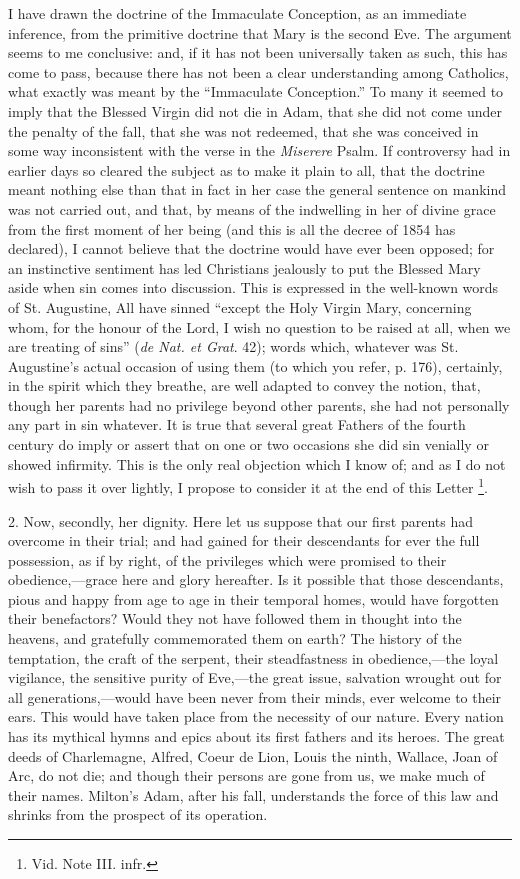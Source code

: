 I have drawn the doctrine of the Immaculate Conception, as an
immediate inference, from the primitive doctrine that Mary is the second
Eve. The argument seems to me conclusive: and, if it has not been
universally taken as such, this has come to pass, because there has not
been a clear understanding among Catholics, what exactly was meant by
the ``Immaculate Conception.'' To many it seemed to imply that
the Blessed Virgin did not die in Adam, that she did not come under the
penalty of the fall, that she was not redeemed, that she was conceived
in some way inconsistent with the verse in the \emph{Miserere} Psalm. If
controversy had in earlier days so cleared the subject as to make it
plain to all, that the doctrine meant nothing else than that in fact in
her case the general sentence on mankind was not carried out, and that,
by means of the indwelling in her of divine grace from the first moment
of her being (and this is all the decree of 1854 has declared), I cannot
believe that the doctrine would have ever been opposed; for an
instinctive sentiment has led Christians jealously to put the Blessed
Mary aside when sin comes into discussion. This is expressed in the
well-known words of St. Augustine, All have sinned ``except the Holy
Virgin Mary, concerning whom, for the honour of the Lord, I wish no
question to be raised at all, when we are treating of sins'' (\emph{de
Nat. et Grat}. 42); words which, whatever was St. Augustine's actual
occasion of using them (to which you refer, p. 176), certainly, in the
spirit which they breathe, are well adapted to convey the notion, that,
though her parents had no privilege beyond other parents, she had not
personally any part in sin whatever. It is true that several great
Fathers of the fourth century do imply or assert that on one or two
occasions she did sin venially or showed infirmity. This is the only
real objection which I know of; and as I do not wish to pass it over
lightly, I propose to consider it at the end of this Letter \footnote{Vid. Note
III. infr.}.

2. Now, secondly, her dignity. Here let us suppose that our first
parents had overcome in their trial; and had gained for their
descendants for ever the full possession, as if by right, of the
privileges which were promised to their obedience,—grace here and
glory hereafter. Is it possible that those descendants, pious and happy
from age to age in their temporal homes, would have forgotten their
benefactors? Would they not have followed them in thought into the
heavens, and gratefully commemorated them on earth? The history of the
temptation, the craft of the serpent, their steadfastness in
obedience,—the loyal vigilance, the sensitive purity of Eve,—the
great issue, salvation wrought out for all generations,—would have
been never from their minds, ever welcome to their ears. This would have
taken place from the necessity of our nature. Every nation has its
mythical hymns and epics about its first fathers and its heroes. The
great deeds of Charlemagne, Alfred, Coeur de Lion, Louis the ninth,
Wallace, Joan of Arc, do not die; and though their persons are gone from
us, we make much of their names. Milton's Adam, after his fall,
understands the force of this law and shrinks from the prospect of its
operation.


